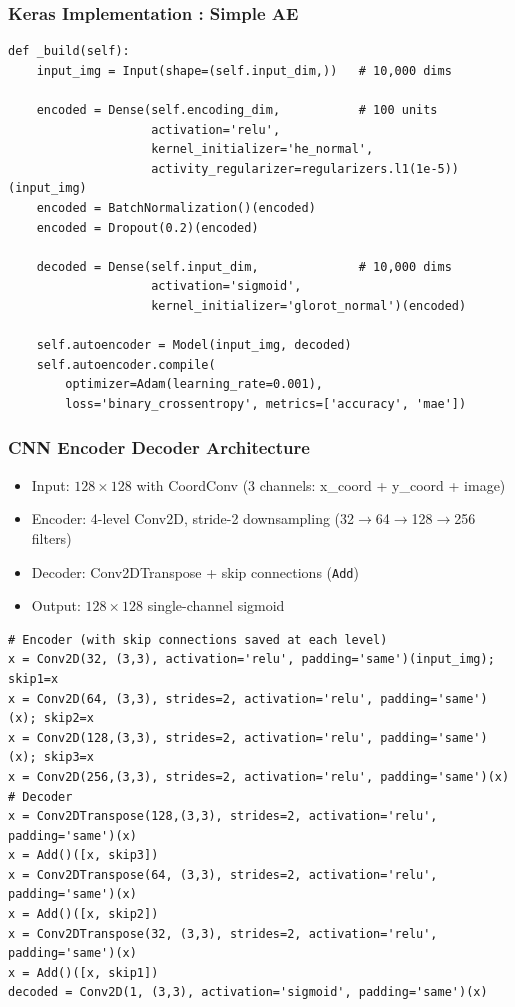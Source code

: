 \begin{frame}[fragile]\frametitle{Keras Implementation :  Simple AE}

\begin{lstlisting}[basicstyle=\tiny]
def _build(self):
    input_img = Input(shape=(self.input_dim,))   # 10,000 dims

    encoded = Dense(self.encoding_dim,           # 100 units
                    activation='relu',
                    kernel_initializer='he_normal',
                    activity_regularizer=regularizers.l1(1e-5))(input_img)
    encoded = BatchNormalization()(encoded)
    encoded = Dropout(0.2)(encoded)

    decoded = Dense(self.input_dim,              # 10,000 dims
                    activation='sigmoid',
                    kernel_initializer='glorot_normal')(encoded)

    self.autoencoder = Model(input_img, decoded)
    self.autoencoder.compile(
        optimizer=Adam(learning_rate=0.001),
        loss='binary_crossentropy', metrics=['accuracy', 'mae'])
\end{lstlisting}
\end{frame}

\begin{frame}[fragile]\frametitle{CNN Encoder Decoder Architecture}
\begin{itemize}
\item Input: $128 \times 128$ with CoordConv (3 channels: x\_coord + y\_coord + image)
\item Encoder: 4-level Conv2D, stride-2 downsampling (32$\to$64$\to$128$\to$256 filters)
\item Decoder: Conv2DTranspose + skip connections (\texttt{Add})
\item Output: $128 \times 128$ single-channel sigmoid
\end{itemize}
\begin{lstlisting}[basicstyle=\tiny]
# Encoder (with skip connections saved at each level)
x = Conv2D(32, (3,3), activation='relu', padding='same')(input_img); skip1=x
x = Conv2D(64, (3,3), strides=2, activation='relu', padding='same')(x); skip2=x
x = Conv2D(128,(3,3), strides=2, activation='relu', padding='same')(x); skip3=x
x = Conv2D(256,(3,3), strides=2, activation='relu', padding='same')(x)
# Decoder
x = Conv2DTranspose(128,(3,3), strides=2, activation='relu', padding='same')(x)
x = Add()([x, skip3])
x = Conv2DTranspose(64, (3,3), strides=2, activation='relu', padding='same')(x)
x = Add()([x, skip2])
x = Conv2DTranspose(32, (3,3), strides=2, activation='relu', padding='same')(x)
x = Add()([x, skip1])
decoded = Conv2D(1, (3,3), activation='sigmoid', padding='same')(x)
\end{lstlisting}
\end{frame}

